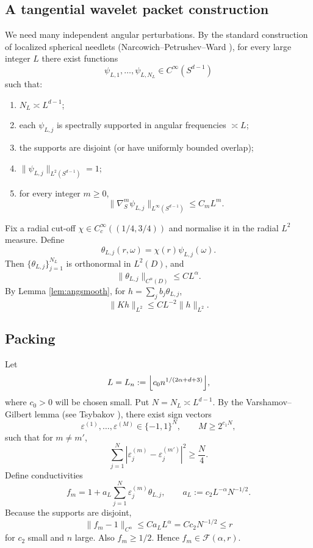 \documentclass[11pt]{article}
\newcommand{\1}{\mathbf{1}}
\begin{document}
\subsection{A tangential wavelet packet construction}

We need many independent angular perturbations. By the standard construction of localized spherical needlets (Narcowich--Petrushev--Ward \cite{NPW}), for every large integer $L$ there exist functions
\[
\psi_{L,1},\dots,\psi_{L,N_L}\in C^\infty(S^{d-1})
\]
such that:
\begin{enumerate}[label=(\roman*)]
\item $N_L\asymp L^{d-1}$;
\item each $\psi_{L,j}$ is spectrally supported in angular frequencies $\asymp L$;
\item the supports are disjoint (or have uniformly bounded overlap);
\item $\|\psi_{L,j}\|_{L^2(S^{d-1})}=1$;
\item for every integer $m\ge0$,
\[
\|\nabla_S^m\psi_{L,j}\|_{L^\infty(S^{d-1})}
\le C_m L^m.
\]
\end{enumerate}
Fix a radial cut-off $\chi\in C_c^\infty((1/4,3/4))$ and normalise it in the radial $L^2$ measure. Define
\[
\theta_{L,j}(r,\omega)=\chi(r)\psi_{L,j}(\omega).
\]
Then $\{\theta_{L,j}\}_{j=1}^{N_L}$ is orthonormal in $L^2(D)$, and
\[
\|\theta_{L,j}\|_{C^\alpha(D)}\le C L^\alpha.
\]
By Lemma \ref{lem:angsmooth}, for $h=\sum_j b_j\theta_{L,j}$,
\begin{equation}\label{eq:Kang}
\|Kh\|_{L^2}\le C L^{-2}\|h\|_{L^2}.
\end{equation}

\subsection{Packing}

Let
\[
L=L_n:=\Bigl\lfloor c_0 n^{1/(2\alpha+d+3)}\Bigr\rfloor,
\]
where $c_0>0$ will be chosen small. Put $N=N_L\asymp L^{d-1}$. By the Varshamov--Gilbert lemma (see Tsybakov \cite[Lemma 2.9]{Tsybakov}), there exist sign vectors
\[
\varepsilon^{(1)},\dots,\varepsilon^{(M)}\in\{-1,1\}^N,
\qquad
M\ge 2^{c_1N},
\]
such that for $m\neq m'$,
\[
\sum_{j=1}^N |\varepsilon_j^{(m)}-\varepsilon_j^{(m')}|^2
\ge \frac N4.
\]
Define conductivities
\[
f_m=1+a_L\sum_{j=1}^N\varepsilon_j^{(m)}\theta_{L,j},
\qquad
a_L:=c_2 L^{-\alpha}N^{-1/2}.
\]
Because the supports are disjoint,
\[
\|f_m-1\|_{C^\alpha}
\le C a_L L^\alpha
= Cc_2 N^{-1/2}
\le r
\]
for $c_2$ small and $n$ large. Also $f_m\ge1/2$. Hence $f_m\in\mathcal F(\alpha,r)$.
\end{document}
